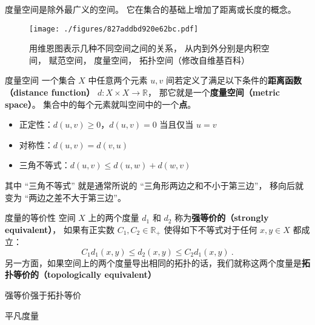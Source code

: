 

度量空间是除外最广义的空间。 它在集合的基础上增加了距离或长度的概念。
\begin{figure}[ht]
\centering
\texttt{[image: ./figures/827addbd920e62bc.pdf]}
\caption{用维恩图表示几种不同空间之间的关系， 从内到外分别是内积空间， 赋范空间， 度量空间， 拓扑空间（修改自维基百科）} \label{fig_Metric_2}
\end{figure}

\begin{definition}{度量空间}\label{def_Metric_2}
一个集合 $X$ 中任意两个元素 $u, v$ 间若定义了满足以下条件的\textbf{距离函数（distance function）} $d: X \times X \to \mathbb{R}$， 那它就是一个\textbf{度量空间（metric space）}。 集合中的每个元素就叫空间中的一个\textbf{点}。
\begin{itemize}
\item 正定性：$d(u, v) \geq 0$，$d(u, v)=0$ 当且仅当 $u=v$
\item 对称性：$d(u, v) = d(v, u)$
\item 三角不等式：$d(u, v) \leqslant d(u, w) + d(w, v)$
\end{itemize}
\end{definition}
\addTODO{距离有$[0, +\infty)$和$[0, \infty]$两种定义，在拓扑等价的意义下可以互相转换。}

其中 “三角不等式” 就是通常所说的 “三角形两边之和不小于第三边”， 移向后就变为 “两边之差不大于第三边”。

\begin{definition}{度量的等价性}
空间 $X$ 上的两个度量 $d_1$ 和 $d_2$ 称为\textbf{强等价的（strongly equivalent）}， 如果有正实数 $C_1, C_2 \in \mathbb{R}_+$ 使得如下不等式对于任何 $x, y \in X$ 都成立：
$$
C_1 d_1(x, y) \leq d_2(x, y) \leq C_2 d_1(x, y)~.
$$
另一方面，如果空间上的两个度量导出相同的拓扑的话，我们就称这两个度量是\textbf{拓扑等价的（topologically equivalent）}
\end{definition}

\begin{theorem}{强等价强于拓扑等价}

\end{theorem}


\begin{example}{平凡度量}
\end{example}


